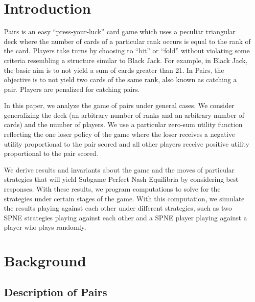 \documentclass{article}
\theoremstyle{definition}
\newcounter{a}
\begin{document}
\section{Introduction}

\indent \indent Pairs is an easy ``press-your-luck'' card game which uses a peculiar triangular deck where the number of cards of a particular rank occurs is equal to the rank of the card.  Players take turns by choosing to ``hit'' or ``fold'' without violating some criteria resembling a structure similar to Black Jack.  For example, in Black Jack, the basic aim is to not yield a sum of cards greater than 21.  In Pairs, the objective is to not yield two cards of the same rank, also known as catching a pair.  Players are penalized for catching pairs.

In this paper, we analyze the game of pairs under general cases.  We consider generalizing the deck (an arbitrary number of ranks and an arbitrary number of cards) and the number of players.  We use a particular zero-sum utility function reflecting the one loser policy of the game where the loser receives a negative utility proportional to the pair scored and all other players receive positive utility proportional to the pair scored.

We derive results and invariants about the game and the moves of particular strategies that will yield Subgame Perfect Nash Equilibria by considering best responses.  With these results, we program computations to solve for the strategies under certain stages of the game.  With this computation, we simulate the results playing against each other under different strategies, such as two SPNE strategies playing against each other and a SPNE player playing against a player who plays randomly.

\section{Background}

\subsection{Description of Pairs}
\end{document}
